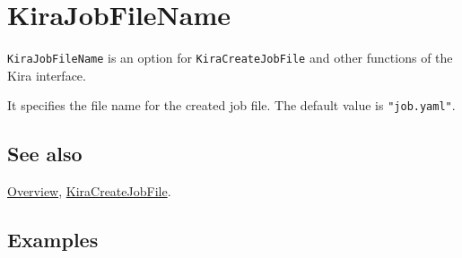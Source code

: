 \documentclass[../FeynHelpersManual.tex]{subfiles}
\begin{document}
\hypertarget{kirajobfilename}{
\section{KiraJobFileName}\label{kirajobfilename}}

\texttt{KiraJobFileName} is an option for \texttt{KiraCreateJobFile} and
other functions of the Kira interface.

It specifies the file name for the created job file. The default value
is \texttt{"job.yaml"}.

\subsection{See also}

\hyperlink{toc}{Overview},
\hyperlink{kiracreatejobfile}{KiraCreateJobFile}.

\subsection{Examples}
\end{document}
